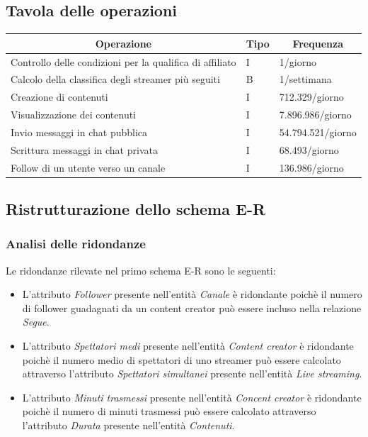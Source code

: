 \subsection{Tavola delle operazioni}
\begin{center}
\begin{tabular}{|p{10cm}|p{1cm}|p{3cm}|}
 \hline
 \multicolumn{1}{|c|}{\textbf{Operazione}} 
 & \multicolumn{1}{|c|}{\textbf{Tipo}}
 & \multicolumn{1}{|c|}{\textbf{Frequenza}}\\
  \hline
  Controllo delle condizioni per la qualifica di affiliato & I & 1/giorno\\
  \hline
  Calcolo della classifica degli streamer più seguiti & B & 1/settimana\\
 \hline
  Creazione di contenuti & I & 712.329/giorno\\
  \hline
  Visualizzazione dei contenuti & I & 7.896.986/giorno\\
 \hline 
  Invio messaggi in chat pubblica & I & 54.794.521/giorno\\
 \hline
  Scrittura messaggi in chat privata & I & 68.493/giorno\\
 \hline
  Follow di un utente verso un canale & I & 136.986/giorno\\
 \hline
\end{tabular}
\end{center}






\subsection{Ristrutturazione dello schema E-R}

\subsubsection{Analisi delle ridondanze}
Le ridondanze rilevate nel primo schema E-R sono le seguenti:
\begin{itemize}
\itemsep0.5em
    \item L'attributo \textit{Follower} presente nell'entità \textit{Canale} è ridondante poichè il numero di follower guadagnati da un content creator può essere incluso nella relazione \textit{Segue}.
    \item L'attributo \textit{Spettatori medi} presente nell'entità \textit{Content creator} è ridondante poichè il numero medio di spettatori di uno streamer può essere calcolato attraverso l'attributo \textit{Spettatori simultanei} presente nell'entità \textit{Live streaming}.
    \item L'attributo \textit{Minuti trasmessi} presente nell'entità \textit{Concent creator} è ridondante poichè il numero di minuti trasmessi può essere calcolato attraverso l'attributo \textit{Durata} presente nell'entità \textit{Contenuti}.
\end{itemize}



